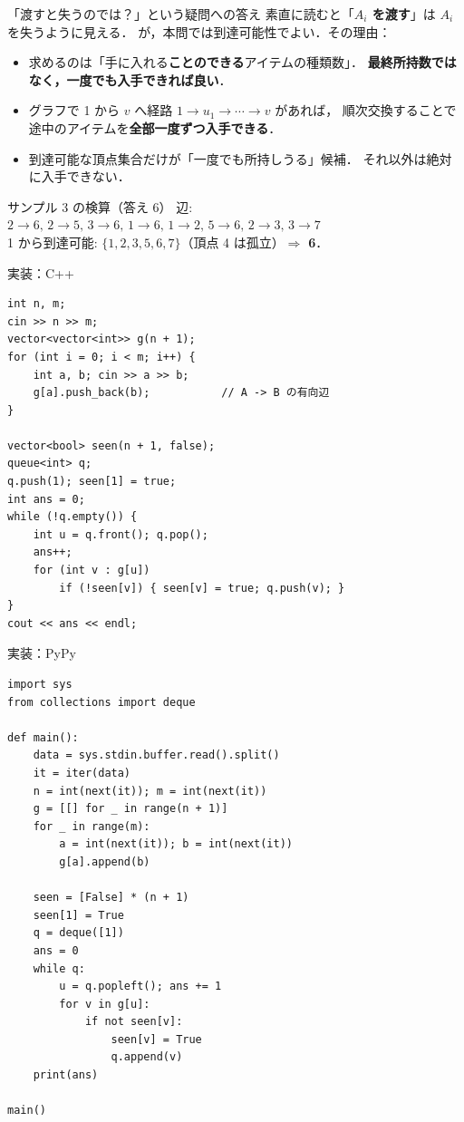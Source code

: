 \documentclass[dvipdfmx,aspectratio=169]{beamer}
\begin{document}
\begin{frame}{「渡すと失うのでは？」という疑問への答え}
  素直に読むと「\textbf{$A_i$ を渡す}」は $A_i$ を失うように見える．
  が，本問では到達可能性でよい．その理由：

  \vspace{0.6em}
  \begin{itemize}
    \item 求めるのは「手に入れる\textbf{ことのできる}アイテムの種類数」．
      \textbf{最終所持数ではなく，一度でも入手できれば良い}．
    \item グラフで 1 から $v$ へ経路 $1 \to u_1 \to \cdots \to v$ があれば，
      順次交換することで途中のアイテムを\textbf{全部一度ずつ入手できる}．
    \item 到達可能な頂点集合だけが「一度でも所持しうる」候補．
      それ以外は絶対に入手できない．
  \end{itemize}

  \vspace{0.6em}
  \begin{block}{サンプル 3 の検算（答え 6）}
    辺: $2\to 6,\,2\to 5,\,3\to 6,\,1\to 6,\,1\to 2,\,5\to 6,\,2\to 3,\,3\to 7$\\
    1 から到達可能: $\{1,2,3,5,6,7\}$（頂点 4 は孤立）$\Rightarrow$ \textbf{6}．
  \end{block}
\end{frame}

\begin{frame}[fragile]{実装：C++}
\begin{verbatim}
int n, m;
cin >> n >> m;
vector<vector<int>> g(n + 1);
for (int i = 0; i < m; i++) {
    int a, b; cin >> a >> b;
    g[a].push_back(b);           // A -> B の有向辺
}

vector<bool> seen(n + 1, false);
queue<int> q;
q.push(1); seen[1] = true;
int ans = 0;
while (!q.empty()) {
    int u = q.front(); q.pop();
    ans++;
    for (int v : g[u])
        if (!seen[v]) { seen[v] = true; q.push(v); }
}
cout << ans << endl;
\end{verbatim}
\end{frame}

\begin{frame}[fragile]{実装：PyPy}
\begin{verbatim}
import sys
from collections import deque

def main():
    data = sys.stdin.buffer.read().split()
    it = iter(data)
    n = int(next(it)); m = int(next(it))
    g = [[] for _ in range(n + 1)]
    for _ in range(m):
        a = int(next(it)); b = int(next(it))
        g[a].append(b)

    seen = [False] * (n + 1)
    seen[1] = True
    q = deque([1])
    ans = 0
    while q:
        u = q.popleft(); ans += 1
        for v in g[u]:
            if not seen[v]:
                seen[v] = True
                q.append(v)
    print(ans)

main()
\end{verbatim}
\end{frame}
\end{document}
